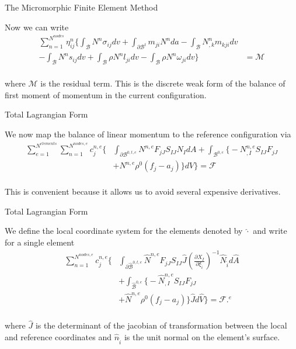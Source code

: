 \documentclass[11pt]{beamer}
\begin{document}
\begin{frame}{The Micromorphic Finite Element Method}

Now we can write
\begin{align*}
\sum_{n=1}^{N^{nodes}} \eta_{ij}^n \bigg\{\int_{\mathcal{B}} N^n \sigma_{ij} dv + \int_{\partial \mathcal{B}^t} m_{ji} N^n da - \int_{\mathcal{B}} N_{,k}^n m_{kji}dv&\\ - \int_{\mathcal{B}} N^n s_{ij}dv + \int_{\mathcal{B}} \rho N^n l_{ji}dv - \int_{\mathcal{B}} \rho N^n \omega_{ji} dv\bigg\}&= \mathcal{M}\\
\end{align*}

where $\mathcal{M}$ is the residual term. This is the discrete weak form of the balance of first moment of momentum in the current configuration.

\end{frame}

\begin{frame}{Total Lagrangian Form}

We now map the balance of linear momentum to the reference configuration via
\begin{align*}
\sum_{e=1}^{N^{elements}} \sum_{n=1}^{N^{nodes,e}} c^{n,e}_j \bigg\{&\int_{\partial \mathcal{B}^{0,t,e}} N^{n,e} F_{jJ} S_{IJ} N_{I} dA + \int_{\mathcal{B}^{0,e}} \big\{- N^{n,e}_{,I} S_{IJ} F_{jJ}\\
& + N^{n,e} \rho^0 \left(f_j - a_j\right) \big\} dV \bigg\} = \mathcal{F}\\
\end{align*}

This is convenient because it allows us to avoid several expensive derivatives.

\end{frame}

\begin{frame}{Total Lagrangian Form}

We define the local coordinate system for the elements denoted by $\hat{\cdot}$ and write for a single element
\begin{align*}
\sum_{n=1}^{N^{nodes,e}} c^{n,e}_j \bigg\{&\int_{\partial \hat{\mathcal{B}}^{0,t,e}} \hat{N}^{n,e} F_{jJ} S_{IJ} \hat{J} \left(\frac{\partial X_{I}}{\partial \xi_{\hat{i}}}\right)^{-1} \hat{N}_{\hat{i}} d\hat{A}\\
& + \int_{\hat{\mathcal{B}}^{0,e}} \big\{- \hat{N}^{n,e}_{,I} S_{IJ} F_{jJ}\\
& + \hat{N}^{n,e} \rho^0 \left(f_j - a_j\right) \big\} \hat{J} d\hat{V} \bigg\} = \mathcal{F}. ^{e}\\
\end{align*}

where $\hat{J}$ is the determinant of the jacobian of transformation between the local and reference coordinates and $\hat{n}_{\hat{i}}$ is the unit normal on the element's surface.

\end{frame}
\end{document}

